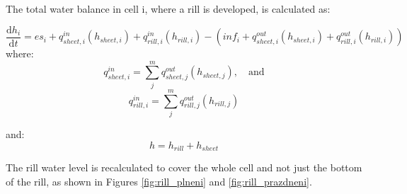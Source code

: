     The total water balance in cell i, where a rill is developed, is calculated as:

    \begin{equation}
        \frac{\mathrm{d}h_i}{\mathrm{d}t} = es_i + q^{in}_{sheet,i}(h_{sheet,i})
        +q^{in}_{rill,i}(h_{rill,i}) - (inf_i + q^{out}_{sheet,i}(h_{sheet,i}) +
        q^{out}_{rill,i}(h_{rill,i}))
    \end{equation}
    where:
    \begin{equation}
        q^{in}_{sheet,i} = \sum_j^m q^{out}_{sheet, j}(h_{sheet,j}),\quad \mathrm{and}
    \end{equation}
    \begin{equation}
        q^{in}_{rill,i} = \sum_j^m q^{out}_{rill, j}(h_{rill,j})
    \end{equation}

    and:
    \begin{equation}
       h = h_{rill} + h_{sheet}  
    \end{equation}

    The rill water level is recalculated to cover the whole cell and not just the
    bottom of the rill, as shown in Figures \ref{fig:rill_plneni} and
    \ref{fig:rill_prazdneni}.

